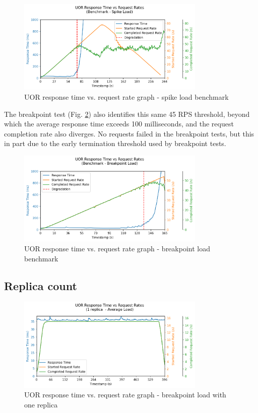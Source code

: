 \begin{figure}[H]
    \centering
    \includegraphics[width=0.8\textwidth]{figures/uor-benchmark-spike.png}
    \caption{UOR response time vs. request rate graph - spike load benchmark}
    \label{figure:uor-benchmark-spike}
\end{figure}

The breakpoint test (Fig. \ref{figure:uor-benchmark-breakpoint}) also identifies this same 45 RPS threshold, beyond which the average response time exceeds 100 milliseconds, and the request completion rate also diverges. No requests failed in the breakpoint tests, but this in part due to the early termination threshold used by breakpoint tests.

\begin{figure}[H]
    \centering
    \includegraphics[width=0.8\textwidth]{figures/uor-benchmark-breakpoint.png}
    \caption{UOR response time vs. request rate graph - breakpoint load benchmark}
    \label{figure:uor-benchmark-breakpoint}
\end{figure}



\subsection{Replica count}

\begin{figure}[h]
    \centering
    \includegraphics[width=0.8\textwidth]{figures/uor-replica-count-i1-average.png}
    \caption{UOR response time vs. request rate graph - breakpoint load with one replica}
    \label{figure:uor-replica-count-i1-average}
\end{figure}

